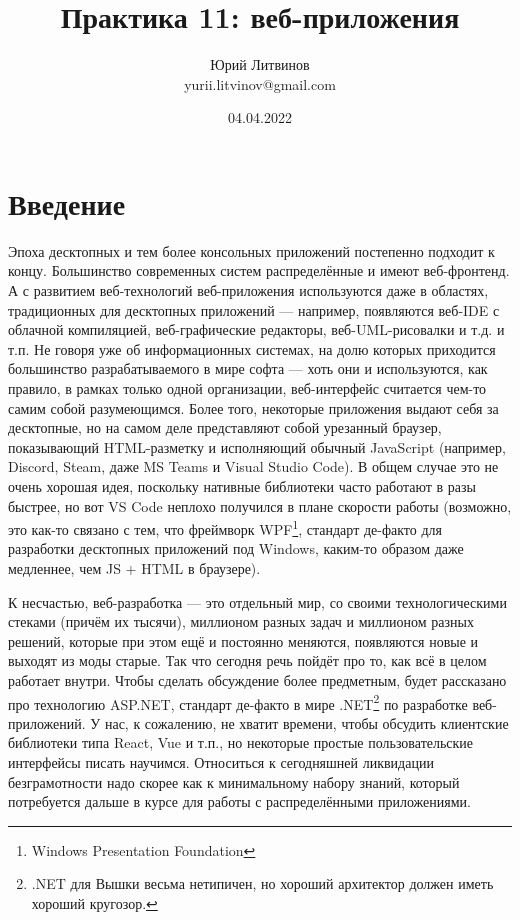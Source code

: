 \documentclass[a5paper]{article}
\title{Практика 11: веб-приложения}
\author{Юрий Литвинов\\\small{yurii.litvinov@gmail.com}}
\date{04.04.2022}
\begin{document}
\maketitle
\thispagestyle{empty}

\section{Введение}

Эпоха десктопных и тем более консольных приложений постепенно подходит к концу. Большинство современных систем распределённые и имеют веб-фронтенд. А с развитием веб-технологий веб-приложения используются даже в областях, традиционных для десктопных приложений --- например, появляются веб-IDE с облачной компиляцией, веб-графические редакторы, веб-UML-рисовалки и т.д. и т.п. Не говоря уже об информационных системах, на долю которых приходится большинство разрабатываемого в мире софта --- хоть они и используются, как правило, в рамках только одной организации, веб-интерфейс считается чем-то самим собой разумеющимся. Более того, некоторые приложения выдают себя за десктопные, но на самом деле представляют собой урезанный браузер, показывающий HTML-разметку и исполняющий обычный JavaScript (например, Discord, Steam, даже MS Teams и Visual Studio Code). В общем случае это не очень хорошая идея, поскольку нативные библиотеки часто работают в разы быстрее, но вот VS Code неплохо получился в плане скорости работы (возможно, это как-то связано с тем, что фреймворк WPF\footnote{Windows Presentation Foundation}, стандарт де-факто для разработки десктопных приложений под Windows, каким-то образом даже медленнее, чем JS + HTML в браузере).

К несчастью, веб-разработка --- это отдельный мир, со своими технологическими стеками (причём их тысячи), миллионом разных задач и миллионом разных решений, которые при этом ещё и постоянно меняются, появляются новые и выходят из моды старые. Так что сегодня речь пойдёт про то, как всё в целом работает внутри. Чтобы сделать обсуждение более предметным, будет рассказано про технологию ASP.NET, стандарт де-факто в мире .NET\footnote{.NET для Вышки весьма нетипичен, но хороший архитектор должен иметь хороший кругозор.} по разработке веб-приложений. У нас, к сожалению, не хватит времени, чтобы обсудить клиентские библиотеки типа React, Vue и т.п., но некоторые простые пользовательские интерфейсы писать научимся. Относиться к сегодняшней ликвидации безграмотности надо скорее как к минимальному набору знаний, который потребуется дальше в курсе для работы с распределёнными приложениями.
\end{document}
